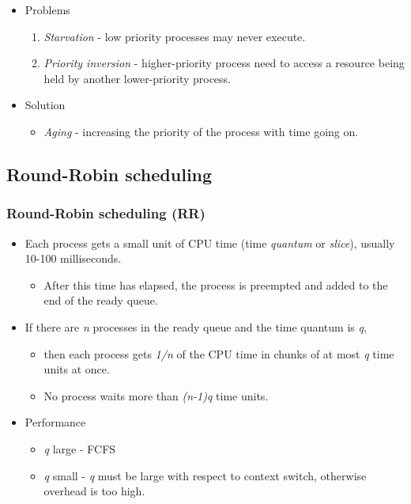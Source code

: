 \documentclass[CJKutf8,xcolor=pdftex,dvipsnames,table]{beamer}
\begin{document}
\begin{CJK*}{UTF8}{song}
\begin{frame}
\begin{itemize}
  \item{Problems} \pause
    \begin{enumerate}
    \item{\emph{Starvation} \pause - low priority processes may never execute.} \pause
    \item{\emph{Priority inversion} \pause - higher-priority process need to access a resource being held by another lower-priority process.} \pause
    \end{enumerate}
  \item{Solution} \pause
    \begin{itemize}
    \item{\emph{Aging} \pause - increasing the priority of the process with
      time going on.}
    \end{itemize}
  \end{itemize}
  \end{frame}
  
  \subsection{Round-Robin scheduling}

  \begin{frame}
  \frametitle{Round-Robin scheduling (RR)} \pause
  \begin{itemize}
  \item{Each process gets a small unit of CPU time (time \emph{quantum} or \emph{slice}), usually 10-100 milliseconds.} \pause
    \begin{itemize}
    \item{After this time has elapsed, the process is preempted and added to the end of the ready queue.} \pause
    \end{itemize}
  \item{If there are \textit{n} processes in the ready queue and the time quantum is \textit{q},} \pause
    \begin{itemize}
    \item{then each process gets \textit{1/n} of the CPU time in chunks of at most \textit{q} time units at once.} \pause
    \item{No process waits more than \textit{(n-1)q} time units.} \pause
    \end{itemize}
  \item{Performance} \pause
    \begin{itemize}
    \item{\textit{q} large \pause - FCFS} \pause
    \item{\textit{q} small \pause - \textit{q} must be large with respect to context switch, otherwise overhead is too high.}
    \end{itemize}
  \end{itemize}
  \end{frame}
  

\end{CJK*}
\end{document}
